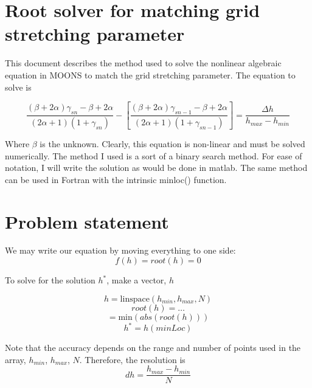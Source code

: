 \documentclass[11pt]{article}
\begin{document}
\doublespacing
\MOONSTITLE
\maketitle

\section{Root solver for matching grid stretching parameter}

This document describes the method used to solve the nonlinear algebraic equation in MOONS to match the grid stretching parameter. The equation to solve is

\begin{equation}
	\frac{(\beta+2\alpha)\gamma_{sn} - \beta + 2\alpha}{(2\alpha+1)(1+\gamma_{sn})}
	-
	\left[
	\frac{(\beta+2\alpha)\gamma_{sn-1} - \beta + 2\alpha}{(2\alpha+1)(1+\gamma_{sn-1})}
	\right]
	=
	\frac{\Delta h}{h_{max}-h_{min}}
\end{equation}

Where $\beta$ is the unknown. Clearly, this equation is non-linear and must be solved numerically. The method I used is a sort of a binary search method. For ease of notation, I will write the solution as would be done in matlab. The same method can be used in Fortran with the intrinsic minloc() function.

\section{Problem statement}
We may write our equation by moving everything to one side:
\begin{equation}
	f(h) = root(h) = 0
\end{equation}

To solve for the solution $h^*$, make a vector, $h$

\begin{equation}
	h = \text{linspace}(h_{min},h_{max},N)
\end{equation}
\begin{equation}
	root(h) = \ldots
\end{equation}
\begin{equation}
	[\text{minVal} \, \text{minLoc}] = \text{min}(abs(root(h)))
\end{equation}
\begin{equation}
	h^* = h(minLoc)
\end{equation}

Note that the accuracy depends on the range and number of points used in the array, $h_{min}$, $h_{max}$, $N$. Therefore, the resolution is
\begin{equation}
	dh = \frac{h_{max}-h_{min}}{N}
\end{equation}
\end{document}
